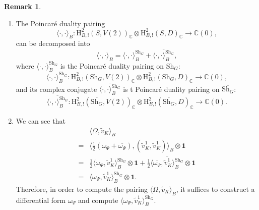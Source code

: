 \documentclass[11pt, a4paper]{amsart}
\theoremstyle{plain}
\theoremstyle{definition}
\newtheorem{remark}[theorem]{Remark}
\numberwithin{equation}{section}
\def\CC{\mathbb{C}}
\newcommand{\Sh}{\mathrm{Sh}}
\begin{document}
\begin{remark}
\begin{enumerate}
              \begin{equation*}
                   \mathrm{H}^{2}_{B, !}(\overline{\Sh_{G}}, V(2))_{\CC}[\pi_f].
              \end{equation*}
        \item The Poincar\'{e} duality pairing 
            \begin{equation*}
                 \langle \cdot, \cdot \rangle_{B} \colon \mathrm{H}^{2}_{B, !}(S, V(2))_{\CC} \otimes \mathrm{H}^{2}_{B, !}(S, D)_{\CC} \rightarrow \CC(0),
            \end{equation*}
            can be decomposed into 
            \begin{equation*}
                 \langle \cdot, \cdot \rangle_{B} = \langle \cdot, \cdot \rangle_{B}^{\Sh_{G}} + \overline{\langle \cdot, \cdot \rangle_{B}^{\Sh_{G}}}, 
            \end{equation*}
            where $\langle \cdot, \cdot \rangle_{B}^{\Sh_{G}}$ is the Poincar\'{e} duality pairing on $\Sh_{G}$: 
            \begin{equation*}
                \langle \cdot, \cdot \rangle_{B}^{\Sh_{G}} \colon \mathrm{H}^{2}_{B, !}(\Sh_{G}, V(2))_{\CC} \otimes \mathrm{H}^{2}_{B, !}(\Sh_{G}, D)_{\CC} \rightarrow \CC(0), 
            \end{equation*}
            and its complex conjugate $\overline{\langle \cdot, \cdot \rangle_{B}^{\Sh_{G}}}$ is t Poincar\'{e} duality pairing on $\overline{\Sh_{G}}$: 
            \begin{equation*}
                \overline{\langle \cdot, \cdot \rangle_{B}^{\Sh_{G}}} \colon \mathrm{H}^{2}_{B, !}(\overline{\Sh_{G}}, V(2))_{\CC} \otimes \mathrm{H}^{2}_{B, !}(\overline{\Sh_{G}}, D)_{\CC} \rightarrow \CC(0). 
            \end{equation*}
        \item  We can see that 
                \begin{align*}
                    & \langle \Omega, \tilde{v}_{K} \rangle_{B} \\
                 =  & \langle \frac{1}{2} (\omega_{\Psi} + \overline{\omega_{\Psi}}), (\tilde{v}_{K}^{1}, \tilde{v}_{K}^{1}) \rangle_{B} \otimes \mathbf{1} \\
                 =  & \frac{1}{2} \langle \omega_{\Psi}, \tilde{v}_{K}^{1} \rangle_{B}^{\Sh_{G}} \otimes \mathbf{1} + \frac{1}{2} \overline{\langle \overline{\omega_{\Psi}}, \tilde{v}_{K}^{1} \rangle_{B}^{\Sh_{G}}}  \otimes \mathbf{1}\\
                 =  & \langle \omega_{\Psi}, \tilde{v}_{K}^{1} \rangle_{B}^{\Sh_{G}} \otimes \mathbf{1}. 
                \end{align*}
                Therefore, in order to compute the pairing $\langle \Omega, \tilde{v}_{K} \rangle_{B}$, it suffices to construct a differential form $\omega_{\Psi}$ and compute $\langle \omega_{\Psi}, \tilde{v}_{K}^{1} \rangle_{B}^{\Sh_{G}}$. 
    \end{enumerate}
\end{remark}
\end{document}
